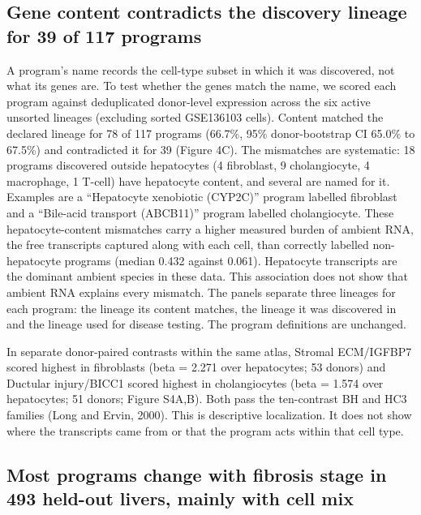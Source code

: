 

\subsection{Gene content contradicts the discovery lineage for 39 of 117 programs}\label{gene-content-contradicts-the-discovery-lineage-for-37-of-117-programs}

A program's name records the cell-type subset in which it was discovered, not what its genes are. To test whether the genes match the name, we scored each program against deduplicated donor-level expression across the six active unsorted lineages (excluding sorted GSE136103 cells). Content matched the declared lineage for 78 of 117 programs (66.7\%, 95\% donor-bootstrap CI 65.0\% to 67.5\%) and contradicted it for 39 (Figure 4C). The mismatches are systematic: 18 programs discovered outside hepatocytes (4 fibroblast, 9 cholangiocyte, 4 macrophage, 1 T-cell) have hepatocyte content, and several are named for it. Examples are a ``Hepatocyte xenobiotic (CYP2C)'' program labelled fibroblast and a ``Bile-acid transport (ABCB11)'' program labelled cholangiocyte. These hepatocyte-content mismatches carry a higher measured burden of ambient RNA, the free transcripts captured along with each cell, than correctly labelled non-hepatocyte programs (median 0.432 against 0.061). Hepatocyte transcripts are the dominant ambient species in these data. This association does not show that ambient RNA explains every mismatch. The panels separate three lineages for each program: the lineage its content matches, the lineage it was discovered in and the lineage used for disease testing. The program definitions are unchanged.

In separate donor-paired contrasts within the same atlas, Stromal ECM/IGFBP7 scored highest in fibroblasts (beta = 2.271 over hepatocytes; 53 donors) and Ductular injury/BICC1 scored highest in cholangiocytes (beta = 1.574 over hepatocytes; 51 donors; Figure S4A,B). Both pass the ten-contrast BH and HC3 families (Long and Ervin, 2000). This is descriptive localization. It does not show where the transcripts came from or that the program acts within that cell type.

\subsection{Most programs change with fibrosis stage in 493 held-out livers, mainly with cell mix}\label{most-programs-change-with-fibrosis-stage-in-493-held-out-livers}

